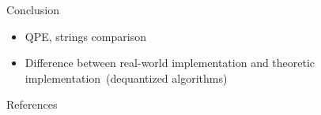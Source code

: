 \documentclass{beamer}
\begin{document}
\begin{frame}{Conclusion}
    \begin{itemize}
        \item QPE, strings comparison\pause
        \item Difference between real-world implementation and theoretic implementation\pause\ (dequantized algorithms)
    \end{itemize}

\end{frame}


\begin{frame}[allowframebreaks]{References}
    \printbibliography
\end{frame}
\end{document}
